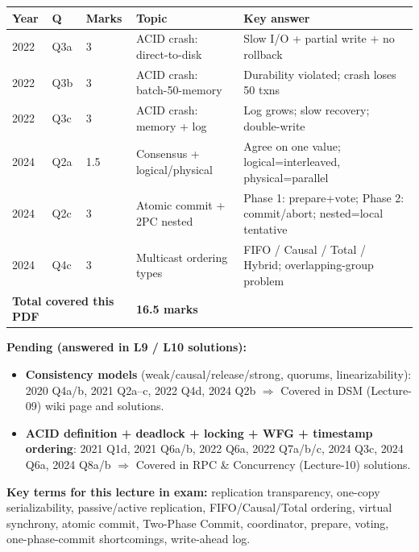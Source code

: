 \documentclass[12pt,a4paper]{article}
\begin{document}
\begin{center}
\renewcommand{\arraystretch}{1.35}
\begin{tabular}{lllll}
\toprule
\textbf{Year} & \textbf{Q} & \textbf{Marks} & \textbf{Topic} & \textbf{Key answer} \\
\midrule
2022 & Q3a & 3 & ACID crash: direct-to-disk & Slow I/O + partial write + no rollback \\
2022 & Q3b & 3 & ACID crash: batch-50-memory & Durability violated; crash loses 50 txns \\
2022 & Q3c & 3 & ACID crash: memory + log & Log grows; slow recovery; double-write \\
2024 & Q2a & 1.5 & Consensus + logical/physical & Agree on one value; logical=interleaved, physical=parallel \\
2024 & Q2c & 3 & Atomic commit + 2PC nested & Phase 1: prepare+vote; Phase 2: commit/abort; nested=local tentative \\
2024 & Q4c & 3 & Multicast ordering types & FIFO / Causal / Total / Hybrid; overlapping-group problem \\
\midrule
\multicolumn{3}{l}{\textbf{Total covered this PDF}} & \multicolumn{2}{l}{\textbf{16.5 marks}} \\
\bottomrule
\end{tabular}
\end{center}

\begin{notesbox}
\textbf{Pending (answered in L9 / L10 solutions):}
\begin{itemize}
  \item \textbf{Consistency models} (weak/causal/release/strong, quorums, linearizability):
        2020 Q4a/b, 2021 Q2a–c, 2022 Q4d, 2024 Q2b
        $\Rightarrow$ Covered in DSM (Lecture-09) wiki page and solutions.
  \item \textbf{ACID definition + deadlock + locking + WFG + timestamp ordering}:
        2021 Q1d, 2021 Q6a/b, 2022 Q6a, 2022 Q7a/b/c, 2024 Q3c, 2024 Q6a, 2024 Q8a/b
        $\Rightarrow$ Covered in RPC \& Concurrency (Lecture-10) solutions.
\end{itemize}

\textbf{Key terms for this lecture in exam:}
replication transparency, one-copy serializability, passive/active replication,
FIFO/Causal/Total ordering, virtual synchrony, atomic commit, Two-Phase Commit,
coordinator, prepare, voting, one-phase-commit shortcomings, write-ahead log.
\end{notesbox}
\end{document}
